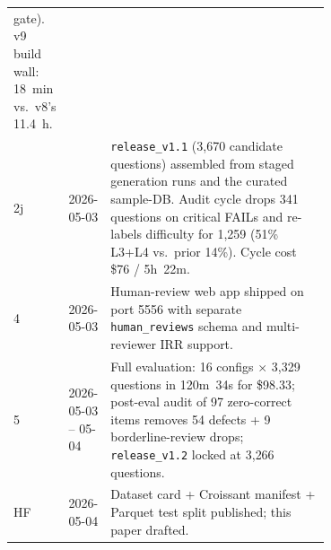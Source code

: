 \begin{table}[h]
\begin{tabular}{llp{0.7\linewidth}}
                               gate). v9 build wall: 18~min vs.\ v8's 11.4~h. \\
    2j  & 2026-05-03         & \texttt{release\_v1.1} (3{,}670 candidate questions)
                               assembled from staged generation runs and the curated
                               sample-DB. Audit cycle drops 341 questions on critical
                               FAILs and re-labels difficulty for 1{,}259 (51\%
                               L3+L4 vs.\ prior 14\%). Cycle cost \$76 / 5h~22m. \\
    4   & 2026-05-03         & Human-review web app shipped on port 5556 with
                               separate \texttt{human\_reviews} schema and
                               multi-reviewer IRR support. \\
    5   & 2026-05-03 -- 05-04 & Full evaluation: 16 configs $\times$ 3{,}329 questions
                               in 120m~34s for \$98.33; post-eval audit of 97
                               zero-correct items removes 54 defects + 9
                               borderline-review drops; \texttt{release\_v1.2}
                               locked at 3{,}266 questions. \\
    HF  & 2026-05-04         & Dataset card + Croissant manifest + Parquet test
                               split published; this paper drafted. \\
    \bottomrule
  \end{tabular}
\end{table}
